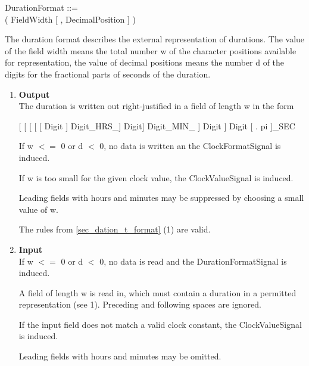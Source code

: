 DurationFormat ::=\\
 ( FieldWidth [ , DecimalPosition ] )

The duration format describes the external representation of durations.
The value of the field width means the total number w of the character
positions available for representation, the value of decimal positions
means the number d of the digits for the fractional parts of seconds of
the duration.

\begin{enumerate}
\item {\bf Output}\\
The duration is written out right-justified in a field of length w in
the form

[ [ [ [ [ Digit ] Digit\_HRS\_] Digit]  Digit\_MIN\_ ] Digit ] Digit [ . pi ]\_SEC

\begin{accepted}
If w $<=$ 0 or d $<$ 0, no data is written an the ClockFormatSignal
   is induced.

If w is too small for the given clock value, the ClockValueSignal
   is induced.

\end{accepted}
\begin{added}
Leading fields with hours and minutes may be suppressed by 
choosing a small value of w. 
\end{added}


\begin{removed}
The rules from \ref{sec_dation_t_format} (1) are valid.
\end{removed}
\item {\bf Input}\\
If w $<=$ 0 or d $<$ 0, no data is read and the DurationFormatSignal
   is induced.

\begin{accepted}
A field of length w is read in, which must contain a duration in a
permitted representation (see 1). Preceding and following spaces are
ignored.

If the input field does not match a valid clock constant, the 
   ClockValueSignal is induced.

\end{accepted}
\begin{added}
Leading fields with hours and minutes may be omitted. 
\end{added}

\end{enumerate}

